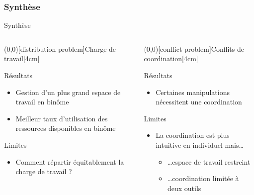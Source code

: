 \documentclass[english,french,dvips,10pt]{mybeamer}
\begin{document}
	\subsubsection{Synthèse}
	\begin{myframe}{Synthèse}
		\begin{columns}[t]
			\begin{column}{0.475\textwidth}
				\centering
				\myunode[90][shadowcolor=mygreen](0,0)[distribution-problem]{Charge de travail}[4cm]
				\begin{myplusblock}{Résultats }
					\begin{itemize}
						\item Gestion d'un plus grand espace de travail en binôme
						\item Meilleur taux d'utilisation des ressources disponibles en binôme
					\end{itemize}
				\end{myplusblock}
				\begin{myminusblock}{Limites}
					\begin{itemize}
						\item Comment répartir équitablement la charge de travail ?
					\end{itemize}
				\end{myminusblock}
			\end{column}
			\begin{column}{0.475\textwidth}
				\centering
				\myunode[90][shadowcolor=mygreen](0,0)[conflict-problem]{Conflits de coordination}[4cm]
				\begin{myplusblock}{Résultats }
					\begin{itemize}
						\item Certaines manipulations nécessitent une coordination
					\end{itemize}
				\end{myplusblock}
				\begin{myminusblock}{Limites}
					\begin{itemize}
						\item La coordination est plus intuitive en individuel mais\dots
							\begin{itemize}
								\item \dots{}espace de travail restreint
								\item \dots{}coordination limitée à deux outils

\end{itemize}
\end{itemize}
\end{myminusblock}
\end{column}
\end{columns}
\end{myframe}
\end{document}
